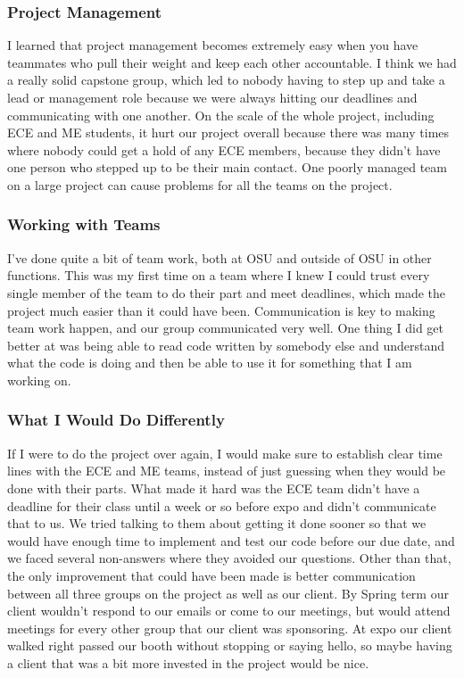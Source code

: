 \documentclass[10pt,letterpaper,onecolumn,draftclsnofoot,journal]{IEEEtran}
\begin{document}
\subsubsection{\textbf{Project Management}}
I learned that project management becomes extremely easy when you have teammates who pull their weight and keep each other accountable. I think we had a really solid capstone group, which led to nobody having to step up and take a lead or management role because we were always hitting our deadlines and communicating with one another. On the scale of the whole project, including ECE and ME students, it hurt our project overall because there was many times where nobody could get a hold of any ECE members, because they didn't have one person who stepped up to be their main contact. One poorly managed team on a large project can cause problems for all the teams on the project.
\vspace{.3cm}

\subsubsection{\textbf{Working with Teams}}
I've done quite a bit of team work, both at OSU and outside of OSU in other functions. This was my first time on a team where I knew I could trust every single member of the team to do their part and meet deadlines, which made the project much easier than it could have been. Communication is key to making team work happen, and our group communicated very well. One thing I did get better at was being able to read code written by somebody else and understand what the code is doing and then be able to use it for something that I am working on.  
\vspace{.3cm}

\subsubsection{\textbf{What I Would Do Differently}}
If I were to do the project over again, I would make sure to establish clear time lines with the ECE and ME teams, instead of just guessing when they would be done with their parts. What made it hard was the ECE team didn't have a deadline for their class until a week or so before expo and didn't communicate that to us. We tried talking to them about getting it done sooner so that we would have enough time to implement and test our code before our due date, and we faced several non-answers where they avoided our questions. Other than that, the only improvement that could have been made is better communication between all three groups on the project as well as our client. By Spring term our client wouldn't respond to our emails or come to our meetings, but would attend meetings for every other group that our client was sponsoring. At expo our client walked right passed our booth without stopping or saying hello, so maybe having a client that was a bit more invested in the project would be nice.
\vspace{.3cm}
\end{document}

